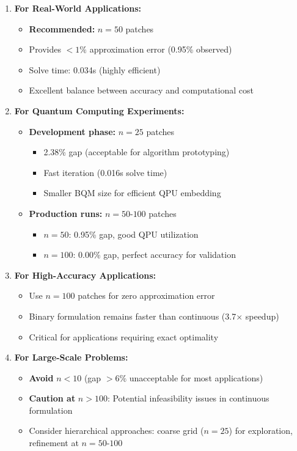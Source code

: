 \documentclass{article}
\begin{document}
\begin{enumerate}
    \item \textbf{For Real-World Applications:}
    \begin{itemize}
        \item \textbf{Recommended:} $n = 50$ patches
        \item Provides $<1\%$ approximation error (0.95\% observed)
        \item Solve time: 0.034s (highly efficient)
        \item Excellent balance between accuracy and computational cost
    \end{itemize}
    
    \item \textbf{For Quantum Computing Experiments:}
    \begin{itemize}
        \item \textbf{Development phase:} $n = 25$ patches
        \begin{itemize}
            \item 2.38\% gap (acceptable for algorithm prototyping)
            \item Fast iteration (0.016s solve time)
            \item Smaller BQM size for efficient QPU embedding
        \end{itemize}
        \item \textbf{Production runs:} $n = 50$-$100$ patches
        \begin{itemize}
            \item $n = 50$: 0.95\% gap, good QPU utilization
            \item $n = 100$: 0.00\% gap, perfect accuracy for validation
        \end{itemize}
    \end{itemize}
    
    \item \textbf{For High-Accuracy Applications:}
    \begin{itemize}
        \item Use $n = 100$ patches for zero approximation error
        \item Binary formulation remains faster than continuous (3.7$\times$ speedup)
        \item Critical for applications requiring exact optimality
    \end{itemize}
    
    \item \textbf{For Large-Scale Problems:}
    \begin{itemize}
        \item \textbf{Avoid} $n < 10$ (gap $>6\%$ unacceptable for most applications)
        \item \textbf{Caution at} $n > 100$: Potential infeasibility issues in continuous formulation
        \item Consider hierarchical approaches: coarse grid ($n = 25$) for exploration, refinement at $n = 50$-$100$
    \end{itemize}
\end{enumerate}
\end{document}
